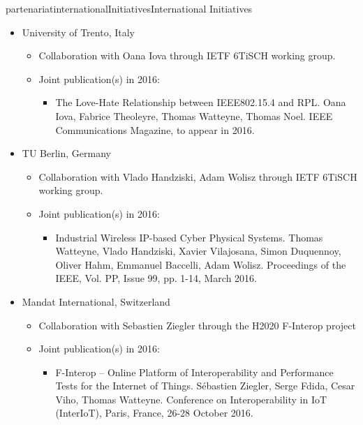 \documentclass{ra2016}
\begin{document}
\begin{module}{partenariat}{internationalInitiatives}{International Initiatives}
\begin{itemize}
\begin{itemize}
\begin{itemize}
                    \item Link-layer Security in TSCH Networks: Effect on Slot Duration.  Savio Sciancalepore, Malisa Vucinic, Giuseppe Piro, Gennaro Boggia, Thomas Watteyne. Wiley Transactions on Emerging Telecommunications Technologies (ETT), to appear in 2016.
                \end{itemize}
        \end{itemize}
    \item University of Trento, Italy
        \begin{itemize}
            \item Collaboration with Oana Iova through IETF 6TiSCH working group.
            \item Joint publication(s) in 2016:
                \begin{itemize}
                    \item The Love-Hate Relationship between IEEE802.15.4 and RPL. Oana Iova, Fabrice Theoleyre, Thomas Watteyne, Thomas Noel. IEEE Communications Magazine, to appear in 2016.
                \end{itemize}
        \end{itemize}
    \item TU Berlin, Germany
        \begin{itemize}
            \item Collaboration with  Vlado Handziski, Adam Wolisz through IETF 6TiSCH working group.
            \item Joint publication(s) in 2016:
                \begin{itemize}
                    \item Industrial Wireless IP-based Cyber Physical Systems. Thomas Watteyne, Vlado Handziski, Xavier Vilajosana, Simon Duquennoy, Oliver Hahm, Emmanuel Baccelli, Adam Wolisz. Proceedings of the IEEE, Vol. PP, Issue 99, pp. 1-14, March 2016.
                \end{itemize}
        \end{itemize}
    \item Mandat International, Switzerland
        \begin{itemize}
            \item Collaboration with Sebastien Ziegler through the H2020 F-Interop project
            \item Joint publication(s) in 2016:
                \begin{itemize}
                    \item F-Interop – Online Platform of Interoperability and Performance Tests for the Internet of Things. Sébastien Ziegler, Serge Fdida, Cesar Viho, Thomas Watteyne. Conference on Interoperability in IoT (InterIoT), Paris, France, 26-28 October 2016.

\end{itemize}
\end{itemize}
\end{itemize}
\end{module}
\end{document}
